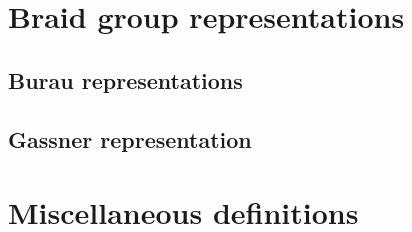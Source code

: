 \section{Braid group representations}

\subsection{Burau representations}

























\subsection{Gassner representation}



\section{Miscellaneous definitions}


